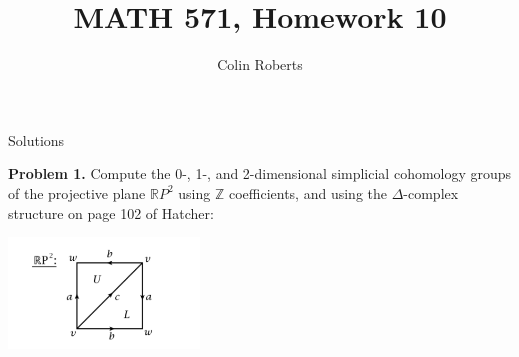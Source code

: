 \documentclass[leqno]{article}
\author{Colin Roberts}
\title{MATH 571, Homework 10}
\theoremstyle{nonumberplain}
\newcommand{\R}{\mathbb{R}}
\newcommand{\Z}{\mathbb{Z}}
\begin{document}
\maketitle
\begin{large}
\begin{center}
Solutions
\end{center}
\end{large}


\noindent\textbf{Problem 1.} 
Compute the 0-, 1-, and 2-dimensional simplicial cohomology groups of the projective plane $\R P^2$ using $\Z$ coefficients, and using the $\Delta$-complex structure on page 102 of Hatcher:
\begin{center}
\includegraphics[width=2in]{RP2Delta.png}
\end{center}
\end{document}
